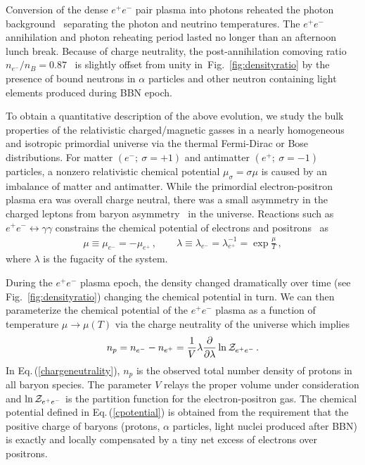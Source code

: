 \documentclass[aps,prd,floatfix,reprint]{revtex4-2}
\newcommand{\req}[1]{Eq.\,(\ref{#1})}
\newcommand{\rf}[1]{Fig.~{\ref{#1}}}
\begin{document}
Conversion of the dense $e^{+}e^{-}$ pair plasma into photons reheated the photon background~\cite{Birrell:2014uka} separating the photon and neutrino temperatures. The $e^{+}e^{-}$ annihilation and photon reheating period lasted no longer than an afternoon lunch break. Because of charge neutrality, the post-annihilation comoving ratio $n_{e^{-}}/n_{B}=0.87$~\cite{Rafelski:2023emw} is slightly offset from unity in~\rf{fig:densityratio} by the presence of bound neutrons in $\alpha$ particles and other neutron containing light elements produced during BBN epoch. 

To obtain a quantitative description of the above evolution, we study the bulk properties of the relativistic charged/magnetic gasses in a nearly homogeneous and isotropic primordial universe via the thermal Fermi-Dirac or Bose distributions. For matter $(e^{-};\ \sigma=+1)$ and antimatter $(e^{+};\ \sigma=-1)$ particles, a nonzero relativistic chemical potential $\mu_{\sigma}=\sigma\mu$ is caused by an imbalance of matter and antimatter. While the primordial electron-positron plasma era was overall charge neutral, there was a small asymmetry in the charged leptons from baryon asymmetry~\cite{Fromerth:2012fe,Canetti:2012zc} in the universe. Reactions such as $e^{+}e^{-}\leftrightarrow\gamma\gamma$ constrains the chemical potential of electrons and positrons~\cite{Elze:1980er} as 
\begin{align}
 \label{cpotential}
 \mu\equiv\mu_{e^{-}}=-\mu_{e^{+}}\,,\qquad
 \lambda\equiv\lambda_{e^{-}}=\lambda_{e^{+}}^{-1}=\exp\frac{\mu}{T}\,,
\end{align}
where $\lambda$ is the fugacity of the system. 

During the $e^{+}e^{-}$ plasma epoch, the density changed dramatically over time (see \rf{fig:densityratio}) changing the chemical potential in turn. We can then parameterize the chemical potential of the $e^{+}e^{-}$ plasma as a function of temperature $\mu\rightarrow\mu(T)$ via the charge neutrality of the universe which implies
\begin{align}
 \label{chargeneutrality}
 n_{p}=n_{e^{-}}-n_{e^{+}}=\frac{1}{V}\lambda\frac{\partial}{\partial\lambda}\ln{\cal Z}_{e^{+}e^{-}}\,.
\end{align}
In \req{chargeneutrality}, $n_{p}$ is the observed total number density of protons in all baryon species. The parameter $V$ relays the proper volume under consideration and $\ln{\cal Z}_{e^{+}e^{-}}$ is the partition function for the electron-positron gas. The chemical potential defined in \req{cpotential} is obtained from the requirement that the positive charge of baryons (protons, $\alpha$ particles, light nuclei produced after BBN) is exactly and locally compensated by a tiny net excess of electrons over positrons.
\end{document}

